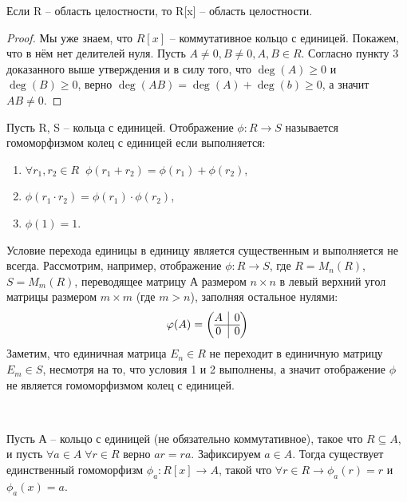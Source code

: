 \begin{corollary}
    Если R -- область целостности, то R[x] -- область целостности.
\end{corollary}

\begin{proof}
    Мы уже знаем, что $R[x]$ -- коммутативное кольцо с единицей. Покажем, что в нём нет делителей нуля.
    Пусть $A \neq 0, B \neq 0, A, B \in R$. Согласно пункту 3 доказанного выше утверждения и в силу 
    того, что $\deg(A) \geq 0$ и $\deg(B) \geq 0$, верно $\deg(AB) = \deg(A) + \deg(b) \geq 0$, 
    а значит $AB \neq 0$.
\end{proof}

\begin{definition}
    Пусть R, S -- кольца с единицей. Отображение $\phi : R \to S$ называется гомоморфизмом колец с единицей если 
    выполняется:
    \begin{enumerate}
        \item $\forall r_1, r_2 \in R \;\; \phi(r_1 + r_2) = \phi(r_1) + \phi(r_2)$,
        \item $\phi(r_1 \cdot r_2) = \phi(r_1) \cdot \phi(r_2)$,
        \item $\phi(1) = 1$.
    \end{enumerate}
\end{definition}

\begin{note}
    Условие перехода единицы в единицу является существенным и выполняется не всегда. Рассмотрим,
    например, отображение $\phi : R \to S$, где $R = M_n(R)$, $S = M_m(R)$, переводящее матрицу А 
    размером $n \times n$ в левый верхний угол матрицы размером $m \times m$ (где $m > n$), 
    заполняя остальное нулями:
    \[\phi(A) = \left(\begin{array}{@{}c|c@{}}
		A & 0\\
		\hline
		0 & 0
	\end{array}\right)\]
    Заметим, что единичная матрица $E_n \in R$ не переходит в единичную матрицу $E_m \in S$, несмотря
    на то, что условия 1 и 2 выполнены, а значит отображение $\phi$ не является гомоморфизмом колец 
    с единицей.
\end{note}

\begin{proposition}~

    Пусть А -- кольцо с единицей (не обязательно коммутативное), такое что $R \subseteq A$, и пусть 
    $\forall a\in A \; \forall r \in R$ верно $ar = ra$. Зафиксируем $a \in A$. Тогда существует 
    единственный гомоморфизм $\phi_a : R[x] \to A$, такой что $\forall r \in R \rightarrow \phi_a(r) = r$ и 
    $\phi_a(x) = a$.
\end{proposition}

